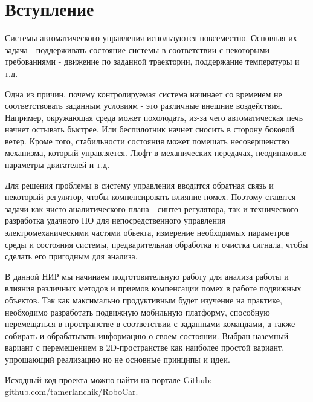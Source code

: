 \documentclass[14pt,a4paper,russian]{scrartcl}
\begin{document}
\renewcommand{\onlyinsubfile}[1]{}
\renewcommand{\notinsubfile}[1]{#1}



\setcounter{page}{3}

\tableofcontents
\newpage

\section*{Вступление}
Системы автоматического управления используются повсеместно. Основная 
их задача - поддерживать состояние системы в соответствии 
с некоторыми требованиями - движение по заданной траектории, поддержание температуры и т.д.

Одна из причин, почему контролируемая система начинает со временем
не соответствовать заданным условиям - это различные внешние воздействия. Например,
окружающая среда может похолодать, из-за чего автоматическая печь начнет остывать
быстрее. Или беспилотник начнет сносить в сторону боковой ветер. Кроме того, 
стабильности состояния может помешать несовершенство механизма, который управляется.
Люфт в механических передачах, неодинаковые параметры двигателей и т.д.

Для решения проблемы в систему управления вводится обратная связь и некоторый 
регулятор, чтобы компенсировать влияние помех. Поэтому ставятся задачи как чисто 
аналитического плана - синтез регулятора, так и технического - разработка
удачного ПО для непосредственного управления электромеханическими частями обьекта,
измерение необходимых параметров среды и состояния системы, предварительная обработка
и очистка сигнала, чтобы сделать его пригодным для анализа.

В данной НИР мы начинаем подготовительную работу для анализа работы и влияния
различных методов и приемов компенсации помех в работе подвижных объектов. 
Так как максимально продуктивным будет изучение на практике, необходимо разработать
подвижную мобильную платформу, способную перемещаться в пространстве в соответствии
с заданными командами, а также собирать и обрабатывать информацию о своем состоянии.
Выбран наземный вариант с перемещением в 2D-пространстве как наиболее простой вариант,
упрощающий реализацию но не основные принципы и идеи.

Исходный код проекта можно найти на портале Github: \\
github.com/tamerlanchik/RoboCar.

\newpage
\end{document}
